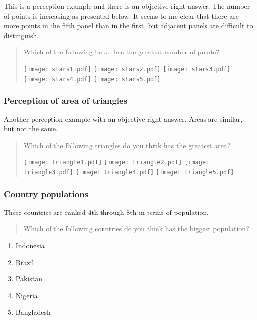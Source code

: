 \documentclass[11pt,letter]{amsart}
\begin{document}
This is a perception example and there is an objective right answer.
The number of points is increasing as presented below.
It seems to me clear that there are more points in the fifth panel than in the first, but adjacent panels are difficult to distinguish.

\begin{quotation}
Which of the following boxes has the greatest number of points?

\texttt{[image: stars1.pdf]}  %
\texttt{[image: stars2.pdf]}  %
\texttt{[image: stars3.pdf]}  %
\texttt{[image: stars4.pdf]}  %
\texttt{[image: stars5.pdf]}
\end{quotation}

\subsubsection{Perception of area of triangles}

Another perception example with an objective right answer. Areas are similar, but not the same.

\begin{quotation}
	Which of the following triangles do you think has the greatest area?

	\texttt{[image: triangle1.pdf]}
	\texttt{[image: triangle2.pdf]}
	\texttt{[image: triangle3.pdf]}
	\texttt{[image: triangle4.pdf]}
	\texttt{[image: triangle5.pdf]}	
\end{quotation}

\subsubsection{Country populations}

These countries are ranked 4th through 8th in terms of population.

\begin{quotation}
Which of the following countries do you think has the biggest population?
\end{quotation}

\begin{enumerate}
\item Indonesia 

\item Brazil 

\item Pakistan 

\item Nigeria 

\item Bangladesh
\end{enumerate}
\end{document}
